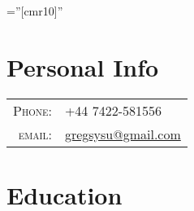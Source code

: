 \documentclass[a4paper,10pt]{article} %
\begin{document}
\pagestyle{empty} %

\font\fb=''[cmr10]'' %


\par{\bigskip\par} %

\section{Personal Info}

\begin{tabular}{rl}
\textsc{Phone:} & +44 7422-581556\\
\textsc{email:} & \href{mailto:gregsysu@gmail.com}{gregsysu@gmail.com}
\end{tabular}


\section{Education}
\end{document}
